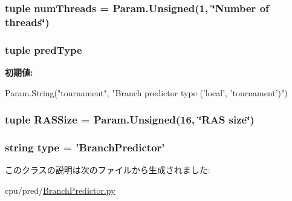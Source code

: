 \label{classBranchPredictor_1_1BranchPredictor_ac2af65faa5d32c894af40e4477fbfe65}
\hypertarget{classBranchPredictor_1_1BranchPredictor_aac03a586f9fcb28bcbe8c3721888fa93}{
\subsubsection[{numThreads}]{\setlength{\rightskip}{0pt plus 5cm}tuple {\bf numThreads} = Param.Unsigned(1, \char`\"{}Number of threads\char`\"{})}}
\label{classBranchPredictor_1_1BranchPredictor_aac03a586f9fcb28bcbe8c3721888fa93}
\hypertarget{classBranchPredictor_1_1BranchPredictor_a21f1c740ec019f8327179a37b26cc7a3}{
\subsubsection[{predType}]{\setlength{\rightskip}{0pt plus 5cm}tuple {\bf predType}}}
\label{classBranchPredictor_1_1BranchPredictor_a21f1c740ec019f8327179a37b26cc7a3}
{\bfseries 初期値:}
\begin{DoxyCode}
Param.String("tournament",
        "Branch predictor type ('local', 'tournament')")
\end{DoxyCode}
\hypertarget{classBranchPredictor_1_1BranchPredictor_ad32cfe43a618dca49f7aba3c597df196}{
\subsubsection[{RASSize}]{\setlength{\rightskip}{0pt plus 5cm}tuple {\bf RASSize} = Param.Unsigned(16, \char`\"{}RAS size\char`\"{})}}
\label{classBranchPredictor_1_1BranchPredictor_ad32cfe43a618dca49f7aba3c597df196}
\hypertarget{classBranchPredictor_1_1BranchPredictor_acce15679d830831b0bbe8ebc2a60b2ca}{
\subsubsection[{type}]{\setlength{\rightskip}{0pt plus 5cm}string {\bf type} = '{\bf BranchPredictor}'}}
\label{classBranchPredictor_1_1BranchPredictor_acce15679d830831b0bbe8ebc2a60b2ca}


このクラスの説明は次のファイルから生成されました:\begin{DoxyCompactItemize}
\item 
cpu/pred/\hyperlink{BranchPredictor_8py}{BranchPredictor.py}\end{DoxyCompactItemize}
